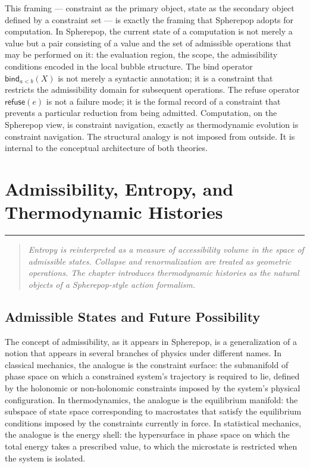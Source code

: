 \documentclass[12pt,openany]{book}
\theoremstyle{plain}
\theoremstyle{definition}
\theoremstyle{remark}
\newcommand{\srefuse}[1]{\mathsf{refuse}\!\left(#1\right)}
\newcommand{\sbind}[2]{\mathsf{bind}_{#1}\!\left(#2\right)}
\newcommand{\chapterrule}{%
  \vspace{4pt}%
  {\color{SpherepopBlue}\rule{\textwidth}{0.8pt}}%
  \vspace{10pt}%
}
\newenvironment{chapterprecis}{%
  \begin{quote}\small\itshape}{%
  \end{quote}\medskip}
\begin{document}
This framing — constraint as the primary object, state as the secondary object defined by a constraint set — is exactly the framing that Spherepop adopts for computation. In Spherepop, the current state of a computation is not merely a value but a pair consisting of a value and the set of admissible operations that may be performed on it: the evaluation region, the scope, the admissibility conditions encoded in the local bubble structure. The bind operator $\sbind{a < b}{X}$ is not merely a syntactic annotation; it is a constraint that restricts the admissibility domain for subsequent operations. The refuse operator $\srefuse{e}$ is not a failure mode; it is the formal record of a constraint that prevents a particular reduction from being admitted. Computation, on the Spherepop view, is constraint navigation, exactly as thermodynamic evolution is constraint navigation. The structural analogy is not imposed from outside. It is internal to the conceptual architecture of both theories.

\chapter{Admissibility, Entropy, and Thermodynamic Histories}
\chapterrule

\begin{chapterprecis}
Entropy is reinterpreted as a measure of accessibility volume in
the space of admissible states. Collapse and renormalization are
treated as geometric operations. The chapter introduces
thermodynamic histories as the natural objects of a
Spherepop-style action formalism.
\end{chapterprecis}

\section{Admissible States and Future Possibility}

The concept of admissibility, as it appears in Spherepop, is a generalization of a notion that appears in several branches of physics under different names. In classical mechanics, the analogue is the constraint surface: the submanifold of phase space on which a constrained system's trajectory is required to lie, defined by the holonomic or non-holonomic constraints imposed by the system's physical configuration. In thermodynamics, the analogue is the equilibrium manifold: the subspace of state space corresponding to macrostates that satisfy the equilibrium conditions imposed by the constraints currently in force. In statistical mechanics, the analogue is the energy shell: the hypersurface in phase space on which the total energy takes a prescribed value, to which the microstate is restricted when the system is isolated.
\end{document}
